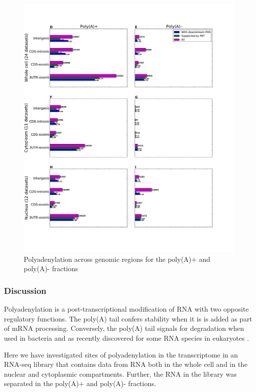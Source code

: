 \begin{figure}[hb]
	\begin{center}
		\includegraphics[scale=0.4]{figures/polyadenylation/Sidebars_pA_2+.pdf}
	\end{center}
	\caption{Polyadenylation across genomic regions for the poly(A)+ and poly(A)-
	fractions}
	\label{fig:sidebars}
\end{figure}

\subsubsection{Discussion}
Polyadenylation is a post-transcriptional modification of RNA with two opposite
regulatory functions. The poly(A) tail confers stability when it is is added as
part of mRNA processing. Conversely, the poly(A) tail signals for degradation
when used in bacteria and as recently discovered for some RNA species in
eukaryotes \cite{shcherbik_polyadenylation_2010}.

Here we have investigated sites of polyadenylation in the transcriptome in an
RNA-seq library that contains data from RNA both in the whole cell and in the
nuclear and cytoplasmic compartments. Further, the RNA in the library was
separated in the poly(A)+ and poly(A)- fractions.

